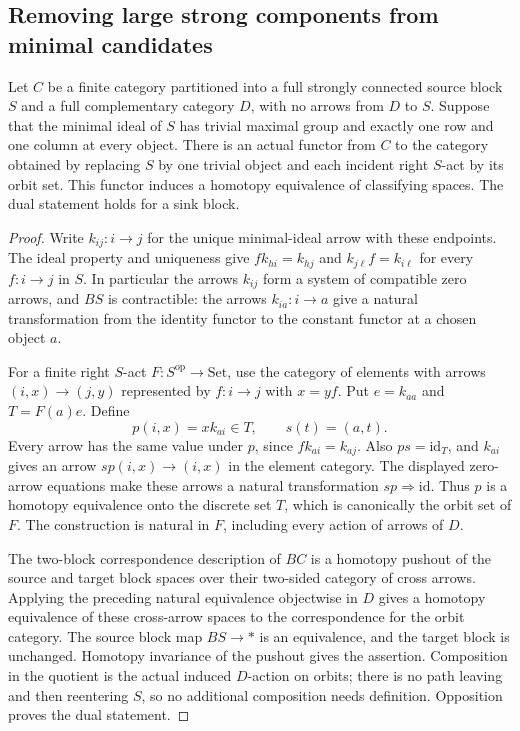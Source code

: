 \subsection{Removing large strong components from minimal candidates}

\begin{lemma}\label{C:extreme-trivial-Rees-block}
Let $C$ be a finite category partitioned into a full strongly
connected source block $S$ and a full complementary category $D$,
with no arrows from $D$ to $S$. Suppose that the minimal ideal
of $S$ has trivial maximal group and exactly one row and one
column at every object. There is an actual functor from $C$ to
the category obtained by replacing $S$ by one trivial object and
each incident right $S$-act by its orbit set. This functor induces
a homotopy equivalence of classifying spaces. The dual statement
holds for a sink block.
\end{lemma}
\begin{proof}
Write $k_{ij}:i\to j$ for the unique minimal-ideal arrow with
these endpoints. The ideal property and uniqueness give
$f k_{hi}=k_{hj}$ and $k_{j\ell}f=k_{i\ell}$ for every
$f:i\to j$ in $S$. In particular the arrows $k_{ij}$ form a
system of compatible zero arrows, and $BS$ is contractible:
the arrows $k_{ia}:i\to a$ give a natural transformation from
the identity functor to the constant functor at a chosen object $a$.

For a finite right $S$-act $F:S^{\mathrm{op}}\to\mathrm{Set}$,
use the category of elements with arrows
$(i,x)\to(j,y)$ represented by $f:i\to j$ with $x=yf$.
Put $e=k_{aa}$ and $T=F(a)e$. Define
\[
 p(i,x)=xk_{ai}\in T,
 \qquad s(t)=(a,t).
\]
Every arrow has the same value under $p$, since
$f k_{ai}=k_{aj}$. Also $ps=\mathrm{id}_T$, and
$k_{ai}$ gives an arrow $s p(i,x)\to(i,x)$ in the element
category. The displayed zero-arrow equations make these arrows
a natural transformation $sp\Rightarrow\mathrm{id}$.
Thus $p$ is a homotopy equivalence onto the discrete set $T$,
which is canonically the orbit set of $F$. The construction is
natural in $F$, including every action of arrows of $D$.

The two-block correspondence description of $BC$ is a homotopy
pushout of the source and target block spaces over their two-sided
category of cross arrows. Applying the preceding natural
equivalence objectwise in $D$ gives a homotopy equivalence of
these cross-arrow spaces to the correspondence for the orbit
category. The source block map $BS\to *$ is an equivalence,
and the target block is unchanged. Homotopy invariance of the
pushout gives the assertion. Composition in the quotient is the
actual induced $D$-action on orbits; there is no path leaving
and then reentering $S$, so no additional composition needs
definition. Opposition proves the dual statement.
\end{proof}

